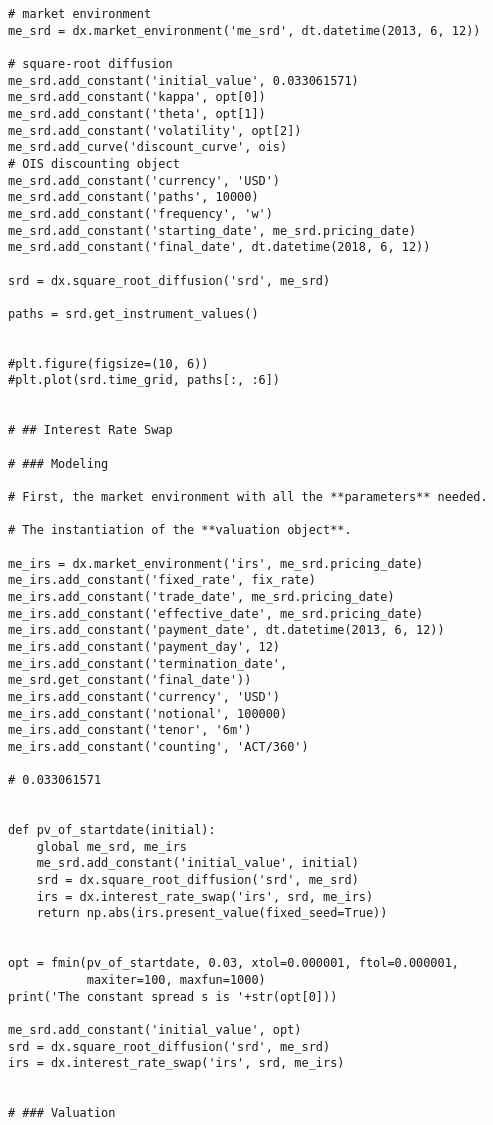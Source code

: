 \documentclass[a4paper, 11pt]{article}
\begin{document}
\begin{lstlisting}
# market environment
me_srd = dx.market_environment('me_srd', dt.datetime(2013, 6, 12))

# square-root diffusion
me_srd.add_constant('initial_value', 0.033061571)
me_srd.add_constant('kappa', opt[0])
me_srd.add_constant('theta', opt[1])
me_srd.add_constant('volatility', opt[2])
me_srd.add_curve('discount_curve', ois)
# OIS discounting object
me_srd.add_constant('currency', 'USD')
me_srd.add_constant('paths', 10000)
me_srd.add_constant('frequency', 'w')
me_srd.add_constant('starting_date', me_srd.pricing_date)
me_srd.add_constant('final_date', dt.datetime(2018, 6, 12))

srd = dx.square_root_diffusion('srd', me_srd)

paths = srd.get_instrument_values()


#plt.figure(figsize=(10, 6))
#plt.plot(srd.time_grid, paths[:, :6])


# ## Interest Rate Swap

# ### Modeling

# First, the market environment with all the **parameters** needed.

# The instantiation of the **valuation object**.

me_irs = dx.market_environment('irs', me_srd.pricing_date)
me_irs.add_constant('fixed_rate', fix_rate)
me_irs.add_constant('trade_date', me_srd.pricing_date)
me_irs.add_constant('effective_date', me_srd.pricing_date)
me_irs.add_constant('payment_date', dt.datetime(2013, 6, 12))
me_irs.add_constant('payment_day', 12)
me_irs.add_constant('termination_date', me_srd.get_constant('final_date'))
me_irs.add_constant('currency', 'USD')
me_irs.add_constant('notional', 100000)
me_irs.add_constant('tenor', '6m')
me_irs.add_constant('counting', 'ACT/360')

# 0.033061571


def pv_of_startdate(initial):
    global me_srd, me_irs
    me_srd.add_constant('initial_value', initial)
    srd = dx.square_root_diffusion('srd', me_srd)
    irs = dx.interest_rate_swap('irs', srd, me_irs)
    return np.abs(irs.present_value(fixed_seed=True))


opt = fmin(pv_of_startdate, 0.03, xtol=0.000001, ftol=0.000001,
           maxiter=100, maxfun=1000)
print('The constant spread s is '+str(opt[0]))

me_srd.add_constant('initial_value', opt)
srd = dx.square_root_diffusion('srd', me_srd)
irs = dx.interest_rate_swap('irs', srd, me_irs)


# ### Valuation


\end{lstlisting}
\end{document}

